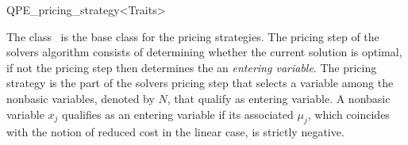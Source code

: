 
\begin{ccRefClass}{QPE_pricing_strategy<Traits>}

\ccDefinition
The class \ccRefName\ is the base class for the pricing strategies.
The pricing step of the solvers algorithm consists of determining  whether the
current solution is optimal, if not the pricing step then determines the an
\emph{entering variable}.
The pricing
strategy is the part of the solvers pricing step that selects a variable among
the nonbasic variables, denoted by $N$, 
that qualify as entering variable. A nonbasic variable
$x_{j}$ qualifies as an entering variable if its associated $\mu_{j}$, which
coincides with the notion of reduced cost in the linear case, is strictly
negative.



\end{ccRefClass}

